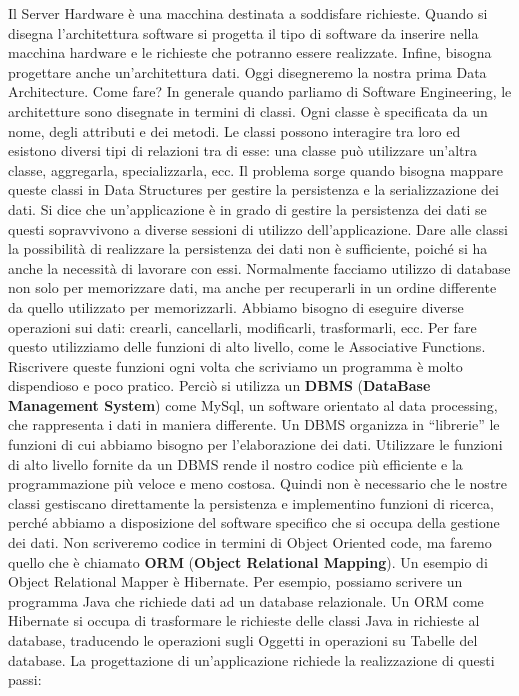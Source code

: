 Il Server Hardware è una macchina destinata a soddisfare richieste. Quando si disegna l’architettura software si progetta il tipo di software da inserire nella macchina hardware e le richieste che potranno essere realizzate. Infine, bisogna progettare anche un’architettura dati.  
Oggi disegneremo la nostra prima Data Architecture. Come fare?  In generale quando parliamo di Software Engineering, le architetture sono disegnate in termini di classi. Ogni classe è specificata da un nome, degli attributi e dei metodi. Le classi possono interagire tra loro ed esistono diversi tipi di relazioni tra di esse: una classe può utilizzare un’altra classe, aggregarla, specializzarla, ecc.  Il problema sorge quando bisogna mappare queste classi in Data Structures per gestire la persistenza e la serializzazione dei dati.  Si dice che un’applicazione è in grado di gestire la persistenza dei dati se questi sopravvivono a diverse sessioni di utilizzo dell’applicazione.  Dare alle classi la possibilità di realizzare la persistenza dei dati non è sufficiente, poiché si ha anche la necessità di lavorare con essi. Normalmente facciamo utilizzo di database non solo per memorizzare dati, ma anche per recuperarli in un ordine differente da quello utilizzato per memorizzarli.  Abbiamo bisogno di eseguire diverse operazioni sui dati: crearli, cancellarli, modificarli, trasformarli, ecc. Per fare questo utilizziamo delle funzioni di alto livello, come le Associative Functions.  Riscrivere queste funzioni ogni volta che scriviamo un programma è molto dispendioso e poco pratico. Perciò si utilizza un \textbf{DBMS} (\textbf{DataBase Management System}) come MySql, un software orientato al data processing, che rappresenta i dati in maniera differente. Un DBMS organizza in “librerie” le funzioni di cui abbiamo bisogno per l’elaborazione dei dati. Utilizzare le funzioni di alto livello fornite da un DBMS rende il nostro codice più efficiente e la programmazione più veloce e meno costosa. Quindi non è necessario che le nostre classi gestiscano direttamente la persistenza e implementino funzioni di ricerca, perché abbiamo a disposizione del software specifico che si occupa della gestione dei dati. Non scriveremo codice in termini di Object Oriented code, ma faremo quello che è chiamato \textbf{ORM} (\textbf{Object Relational Mapping}). Un esempio di Object Relational Mapper è Hibernate. Per esempio, possiamo scrivere un programma Java che richiede dati ad un database relazionale. Un ORM come Hibernate si occupa di trasformare le richieste delle classi Java in richieste al database, traducendo le operazioni sugli Oggetti in operazioni su Tabelle del database. La progettazione di un’applicazione richiede la realizzazione di questi passi:

